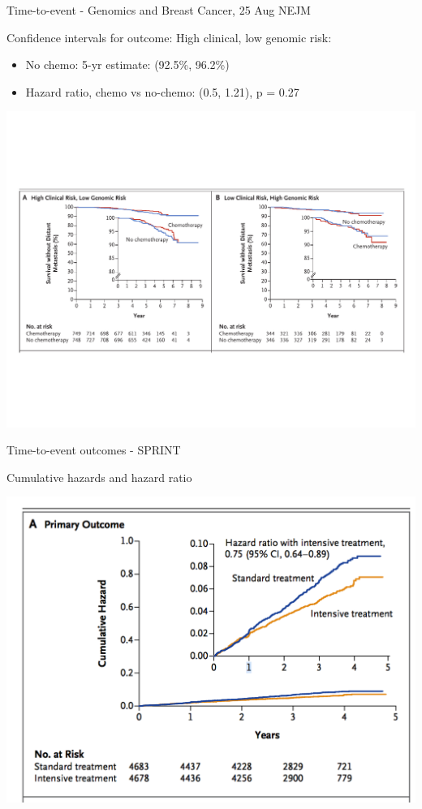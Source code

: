 \documentclass[ignorenonframetext,]{beamer}
\begin{document}
\begin{frame}{Time-to-event - Genomics and Breast Cancer, 25 Aug NEJM}

Confidence intervals for outcome: High clinical, low genomic risk:

\begin{itemize}
\item
  No chemo: 5-yr estimate: (92.5\%, 96.2\%)
\item
  Hazard ratio, chemo vs no-chemo: (0.5, 1.21), p = 0.27
\end{itemize}

\vspace{-0.45in}

\includegraphics{figures/surv_wo_mets.pdf}

\end{frame}

\begin{frame}{Time-to-event outcomes - SPRINT}

Cumulative hazards and hazard ratio

\includegraphics{figures/sprint_primary_outcome.pdf}

\end{frame}
\end{document}
